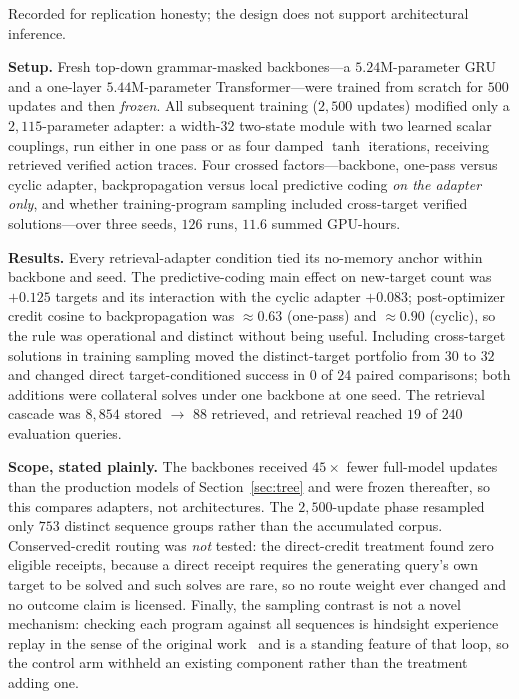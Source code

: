 \documentclass[11pt]{article}
\begin{document}
Recorded for replication honesty; the design does not support architectural inference.

\textbf{Setup.} Fresh top-down grammar-masked backbones---a $5.24$M-parameter GRU and a
one-layer $5.44$M-parameter Transformer---were trained from scratch for $500$ updates and
then \emph{frozen}. All subsequent training ($2{,}500$ updates) modified only a
$2{,}115$-parameter adapter: a width-$32$ two-state module with two learned scalar
couplings, run either in one pass or as four damped $\tanh$ iterations, receiving retrieved
verified action traces. Four crossed factors---backbone, one-pass versus cyclic adapter,
backpropagation versus local predictive coding \emph{on the adapter only}, and whether
training-program sampling included cross-target verified solutions---over three seeds,
$126$ runs, $11.6$ summed GPU-hours.

\textbf{Results.} Every retrieval-adapter condition tied its no-memory anchor within
backbone and seed. The predictive-coding main effect on new-target count was $+0.125$
targets and its interaction with the cyclic adapter $+0.083$; post-optimizer credit cosine
to backpropagation was $\approx0.63$ (one-pass) and $\approx0.90$ (cyclic), so the rule was
operational and distinct without being useful. Including cross-target solutions in training
sampling moved the distinct-target portfolio from $30$ to $32$ and changed direct
target-conditioned success in $0$ of $24$ paired comparisons; both additions were collateral
solves under one backbone at one seed. The retrieval cascade was
$8{,}854$ stored $\rightarrow$ $88$ retrieved, and retrieval reached $19$ of $240$
evaluation queries.

\textbf{Scope, stated plainly.} The backbones received $45\times$ fewer full-model updates
than the production models of Section~\ref{sec:tree} and were frozen thereafter, so this
compares adapters, not architectures. The $2{,}500$-update phase resampled only $753$
distinct sequence groups rather than the accumulated corpus. Conserved-credit routing was
\emph{not} tested: the direct-credit treatment found zero eligible receipts, because a
direct receipt requires the generating query's own target to be solved and such solves are
rare, so no route weight ever changed and no outcome claim is licensed. Finally, the
sampling contrast is not a novel mechanism: checking each program against all sequences is
hindsight experience replay in the sense of the original work~\cite{aliencoding} and is a
standing feature of that loop, so the control arm withheld an existing component rather than
the treatment adding one.
\end{document}

